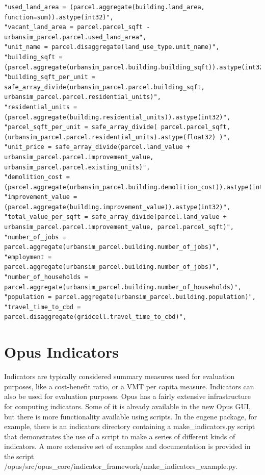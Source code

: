 \begin{lstlisting}
"used_land_area = (parcel.aggregate(building.land_area, function=sum)).astype(int32)",
"vacant_land_area = parcel.parcel_sqft - urbansim_parcel.parcel.used_land_area",
"unit_name = parcel.disaggregate(land_use_type.unit_name)",
"building_sqft = (parcel.aggregate(urbansim_parcel.building.building_sqft)).astype(int32)",
"building_sqft_per_unit = safe_array_divide(urbansim_parcel.parcel.building_sqft, urbansim_parcel.parcel.residential_units)",
"residential_units = (parcel.aggregate(building.residential_units)).astype(int32)",       
"parcel_sqft_per_unit = safe_array_divide( parcel.parcel_sqft, (urbansim_parcel.parcel.residential_units).astype(float32) )",
"unit_price = safe_array_divide(parcel.land_value + urbansim_parcel.parcel.improvement_value, urbansim_parcel.parcel.existing_units)",
"demolition_cost = (parcel.aggregate(urbansim_parcel.building.demolition_cost)).astype(int32)",
"improvement_value = (parcel.aggregate(building.improvement_value)).astype(int32)",
"total_value_per_sqft = safe_array_divide(parcel.land_value + urbansim_parcel.parcel.improvement_value, parcel.parcel_sqft)",
"number_of_jobs = parcel.aggregate(urbansim_parcel.building.number_of_jobs)",
"employment = parcel.aggregate(urbansim_parcel.building.number_of_jobs)",
"number_of_households = parcel.aggregate(urbansim_parcel.building.number_of_households)",
"population = parcel.aggregate(urbansim_parcel.building.population)",
"travel_time_to_cbd = parcel.disaggregate(gridcell.travel_time_to_cbd)",       
\end{lstlisting}

\section{Opus Indicators}
\label{sec:opus-indicators}

Indicators are typically considered summary measures used for evaluation purposes, like a cost-benefit ratio, or a VMT per capita measure.  Indicators can also be used for evaluation purposes.  Opus has a fairly extensive infrastructure for computing indicators.  Some of it is already available in the new Opus GUI, but there is more functionality available using scripts.  In the eugene package, for example, there is an indicators directory containing a make\_indicators.py script that demonstrates the use of a script to make a series of different kinds of indicators.  A more extensive set of examples and documentation is provided in the script  /opus/src/opus\_core/indicator\_framework/make\_indicators\_example.py.

